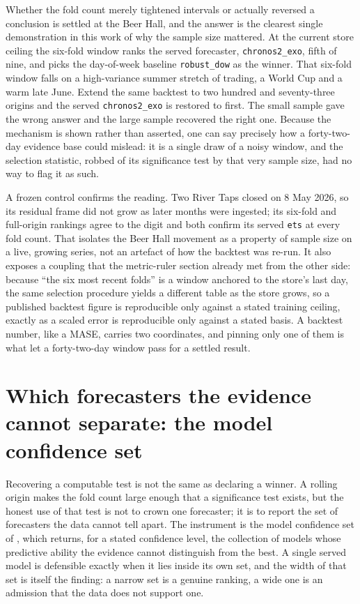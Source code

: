 Whether the fold count merely tightened intervals or actually reversed a conclusion is settled
at the Beer Hall, and the answer is the clearest single demonstration in this work of why the
sample size mattered. At the current store ceiling the six-fold window ranks the served
forecaster, \texttt{chronos2\_exo}, fifth of nine, and picks the day-of-week baseline
\texttt{robust\_dow} as the winner. That six-fold window falls on a high-variance summer
stretch of trading, a World Cup and a warm late June. Extend the same backtest to two hundred
and seventy-three origins and the served \texttt{chronos2\_exo} is restored to first. The small
sample gave the wrong answer and the large sample recovered the right one. Because the
mechanism is shown rather than asserted, one can say precisely how a forty-two-day evidence
base could mislead: it is a single draw of a noisy window, and the selection statistic, robbed
of its significance test by that very sample size, had no way to flag it as such.

A frozen control confirms the reading. Two River Taps closed on 8 May 2026, so its residual
frame did not grow as later months were ingested; its six-fold and full-origin rankings agree
to the digit and both confirm its served \texttt{ets} at every fold count. That isolates the
Beer Hall movement as a property of sample size on a live, growing series, not an artefact of
how the backtest was re-run. It also exposes a coupling that the metric-ruler section already
met from the other side: because ``the six most recent folds'' is a window anchored to the
store's last day, the same selection procedure yields a different table as the store grows, so
a published backtest figure is reproducible only against a stated training ceiling, exactly as
a scaled error is reproducible only against a stated basis. A backtest number, like a MASE,
carries two coordinates, and pinning only one of them is what let a forty-two-day window pass
for a settled result.

\section{Which forecasters the evidence cannot separate: the model confidence set}
\label{sec:mcs}

Recovering a computable test is not the same as declaring a winner. A rolling origin makes the
fold count large enough that a significance test exists, but the honest use of that test is not
to crown one forecaster; it is to report the set of forecasters the data cannot tell apart. The
instrument is the model confidence set of \citet{hansen_model_2011}, which returns, for a
stated confidence level, the collection of models whose predictive ability the evidence cannot
distinguish from the best. A single served model is defensible exactly when it lies inside its
own set, and the width of that set is itself the finding: a narrow set is a genuine ranking, a
wide one is an admission that the data does not support one.

